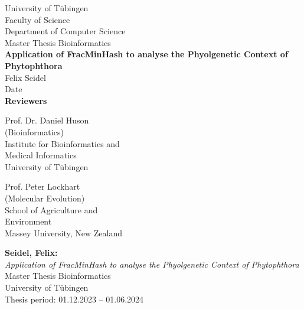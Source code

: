 \documentclass[twoside,12pt,a4paper]{report}
\begin{document}
 
\begin{titlepage}
 \begin{center}
  {\LARGE University of T\"ubingen}\\
  {\large Faculty of Science \\
 Department of Computer Science\\[4cm]}
  {\huge Master Thesis Bioinformatics\\[2cm]}
  {\Large\bf Application of FracMinHash to analyse the Phyolgenetic Context of Phytophthora\\[1.5cm]}
 {\large Felix Seidel}\\[0.5cm]
  Date\\[3cm]
{\small\bf Reviewers}\\[0.5cm]
  \parbox{7cm}{\begin{center}{\large Prof. Dr. Daniel Huson}\\
   (Bioinformatics)\\
  {\footnotesize Institute for Bioinformatics and\\ Medical Informatics\\
	University of T\"ubingen}\end{center}}\hfill\parbox{7cm}{\begin{center}
  {\large Prof. Peter Lockhart}\\
  (Molecular Evolution)\\
  {\footnotesize School of Agriculture and\\ Environment\\
	Massey University, New Zealand}\end{center}
 }
  \end{center}
\end{titlepage}


\thispagestyle{empty}
\vspace*{\fill}
\begin{minipage}{11.2cm}
\textbf{Seidel, Felix:}\\
\emph{Application of FracMinHash to analyse the Phyolgenetic Context of Phytophthora}\\ Master Thesis Bioinformatics\\
University of T\"ubingen\\
Thesis period: 01.12.2023 -- 01.06.2024
\end{minipage}
\newpage
\end{document}
